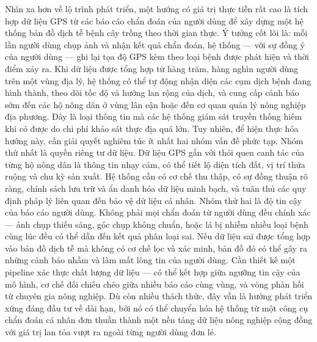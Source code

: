 Nhìn xa hơn về lộ trình phát triển, một hướng có giá trị thực tiễn rất cao là tích hợp dữ liệu GPS từ các báo cáo chẩn đoán của người dùng để xây dựng một hệ thống bản đồ dịch tễ bệnh cây trồng theo thời gian thực.
Ý tưởng cốt lõi là: mỗi lần người dùng chụp ảnh và nhận kết quả chẩn đoán, hệ thống — với sự đồng ý của người dùng — ghi lại tọa độ GPS kèm theo loại bệnh được phát hiện và thời điểm xảy ra. Khi dữ liệu được tổng hợp từ hàng trăm, hàng nghìn người dùng trên một vùng địa lý, hệ thống có thể tự động nhận diện các cụm dịch bệnh đang hình thành, theo dõi tốc độ và hướng lan rộng của dịch, và cung cấp cảnh báo sớm đến các hộ nông dân ở vùng lân cận hoặc đến cơ quan quản lý nông nghiệp địa phương. Đây là loại thông tin mà các hệ thống giám sát truyền thống hiếm khi có được do chi phí khảo sát thực địa quá lớn. Tuy nhiên, để hiện thực hóa hướng này, cần giải quyết nghiêm túc ít nhất hai nhóm vấn đề phức tạp. Nhóm thứ nhất là quyền riêng tư dữ liệu. Dữ liệu GPS gắn với thói quen canh tác của từng hộ nông dân là thông tin nhạy cảm, có thể tiết lộ diện tích đất, vị trí thửa ruộng và chu kỳ sản xuất. Hệ thống cần có cơ chế thu thập, có sự đồng thuận rõ ràng, chính sách lưu trữ và ẩn danh hóa dữ liệu minh bạch, và tuân thủ các quy định pháp lý liên quan đến bảo vệ dữ liệu cá nhân. Nhóm thứ hai là độ tin cậy của báo cáo người dùng. Không phải mọi chẩn đoán từ người dùng đều chính xác — ảnh chụp thiếu sáng, góc chụp không chuẩn, hoặc lá bị nhiễm nhiều loại bệnh cùng lúc đều có thể dẫn đến kết quả phân loại sai. Nếu dữ liệu sai được tổng hợp vào bản đồ dịch tễ mà không có cơ chế lọc và xác minh, bản đồ đó có thể gây ra những cảnh báo nhầm và làm mất lòng tin của người dùng. Cần thiết kế một pipeline xác thực chất lượng dữ liệu — có thể kết hợp giữa ngưỡng tin cậy của mô hình, cơ chế đối chiếu chéo giữa nhiều báo cáo cùng vùng, và vòng phản hồi từ chuyên gia nông nghiệp. Dù còn nhiều thách thức, đây vẫn là hướng phát triển xứng đáng đầu tư về dài hạn, bởi nó có thể chuyển hóa hệ thống từ một công cụ chẩn đoán cá nhân đơn thuần thành một nền tảng dữ liệu nông nghiệp cộng đồng với giá trị lan tỏa vượt ra ngoài từng người dùng đơn lẻ.
\clearpage